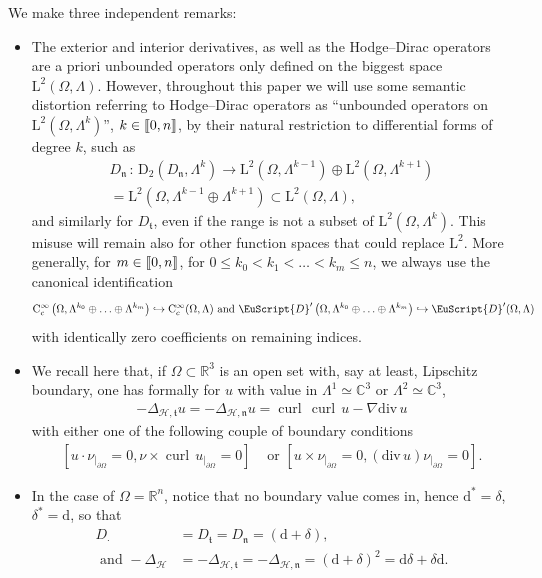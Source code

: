 \documentclass[AHL,Unicode,longabstracts,published]{cedram}
\renewcommand*{\div}{\mathrm{div\,}}
\DeclareMathOperator{\curl}{curl\,}
\newcommand{\bbR}{\mathbb{R}}
\newcommand{\bbC}{\mathbb{C}}
\newcommand{\rmd}{\mathrm{d}}
\newcommand{\rmD}{\mathrm{D}}
\newcommand{\rmL}{\mathrm{L}}
\newcommand{\rmC}{\mathrm{C}}
\newcommand{\clH}{\mathcal{H}}
\newcommand{\fkn}{\mathfrak{n}}
\newcommand{\fkt}{\mathfrak{t}}
\newcommand{\eus}{\EuScript}
\newcommand{\llbracket}{\mathopen{[\mkern -2.7mu[}}
\newcommand{\rrbracket}{\mathclose{]\mkern -2.7mu]}}
\newcommand{\llb}{\llbracket}
\newcommand{\rrb}{\rrbracket}
\begin{document}
\begin{rema}\label{rmk:HodgeLaplacianBC}
We make three independent remarks:
\begin{itemize}
\item The exterior and interior derivatives, as well as the Hodge--Dirac operators are a priori unbounded operators only defined on the biggest space $\rmL^2(\Omega,\Lambda)$. However, throughout this paper we will use some semantic distortion referring to Hodge--Dirac operators as ``unbounded operators on $\rmL^2(\Omega,\Lambda^k)$'', $k\in\llb0,n\rrb$, by their natural restriction to differential forms of degree $k$, such as
\begin{multline*}
D_\fkn \,:\, \rmD_2\left(D_\fkn,\Lambda^k\right)\longrightarrow \rmL^2\left(\Omega,\Lambda^{k-1}\right)\oplus\rmL^2\left(\Omega,\Lambda^{k+1}\right)\\
= \rmL^2\left(\Omega,\Lambda^{k-1}\oplus \Lambda^{k+1}\right)\subset \rmL^2(\Omega,\Lambda),
\end{multline*}
and similarly for $D_\fkt$, even if the range is not a subset of $\rmL^2(\Omega,\Lambda^k)$. This misuse will remain also for other function spaces that could replace $\rmL^2$. More generally, for $m\in\llb0,n\rrb$, for $0\leqslant k_0<k_1<\ldots<k_m\leqslant n$, we always use the canonical identification
\begin{align*}
\rmC _c^\infty\left(\Omega,\Lambda^{k_0} \oplus\ldots\oplus \Lambda^{k_m}\right) \hookrightarrow \rmC _c^\infty(\Omega,\Lambda) \text{ and }\eus{D}'\left(\Omega,\Lambda^{k_0} \oplus\ldots\oplus \Lambda^{k_m}\right) \hookrightarrow \eus{D}'(\Omega,\Lambda)
\end{align*}
with identically zero coefficients on remaining indices.
\item We recall here that, if $\Omega\subset \bbR^3$ is an open set with, say at least, Lipschitz boundary, one has formally for $u$ with value in $\Lambda^1\simeq \bbC^3$ or $\Lambda^2\simeq \bbC^3$,
\begin{align*}
-\Delta_{\clH,\fkt}u =-\Delta_{\clH,\fkn} u = \curl \curl u - \nabla \div u
\end{align*}
with either one of the following couple of boundary conditions
\begin{align*}
\left[u\cdot\nu_{|_{\partial\Omega}} = 0, \nu\times\curl u_{|_{\partial\Omega}} = 0\right]&\text{ or }\left[u\times\nu_{|_{\partial\Omega}} = 0, (\div u)\nu_{|_{\partial\Omega}} = 0\right] .
\end{align*}
\item In the case of $\Omega=\bbR^n$, notice that no boundary value comes in, hence $\rmd^\ast = \delta$, $\delta^\ast=\rmd$, so that
\begin{align*}
D_\cdot&=D_\fkt=D_\fkn = (\rmd+\delta),\\ \text{ and } -\Delta_{\clH}&=-\Delta_{\clH,\fkt}=-\Delta_{\clH,\fkn}= (\rmd+\delta)^2= \rmd\delta+\delta\rmd.
\end{align*}
\end{itemize}
\end{rema}
\end{document}
